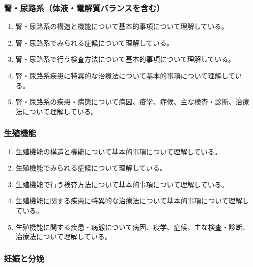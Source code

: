 \hypertarget{ux814eux5c3fux8defux7cfbux4f53ux6db2ux96fbux89e3ux8ceaux30d0ux30e9ux30f3ux30b9ux3092ux542bux3080}{%
\subsubsection{腎・尿路系（体液・電解質バランスを含む）}\label{ux814eux5c3fux8defux7cfbux4f53ux6db2ux96fbux89e3ux8ceaux30d0ux30e9ux30f3ux30b9ux3092ux542bux3080}}

\begin{enumerate}
\def\labelenumi{\arabic{enumi}.}
\tightlist
\item
  腎・尿路系の構造と機能について基本的事項について理解している。
\item
  腎・尿路系でみられる症候について理解している。
\item
  腎・尿路系で行う検査方法について基本的事項について理解している。
\item
  腎・尿路系疾患に特異的な治療法について基本的事項について理解している。
\item
  腎・尿路系の疾患・病態について病因、疫学、症候、主な検査・診断、治療法について理解している。
\end{enumerate}

\hypertarget{ux751fux6b96ux6a5fux80fd}{%
\subsubsection{生殖機能}\label{ux751fux6b96ux6a5fux80fd}}

\begin{enumerate}
\def\labelenumi{\arabic{enumi}.}
\tightlist
\item
  生殖機能の構造と機能について基本的事項について理解している。
\item
  生殖機能でみられる症候について理解している。
\item
  生殖機能で行う検査方法について基本的事項について理解している。
\item
  生殖機能に関する疾患に特異的な治療法について基本的事項について理解している。
\item
  生殖機能に関する疾患・病態について病因、疫学、症候、主な検査・診断、治療法について理解している。
\end{enumerate}

\hypertarget{ux598aux5a20ux3068ux5206ux5a29}{%
\subsubsection{妊娠と分娩}\label{ux598aux5a20ux3068ux5206ux5a29}}

